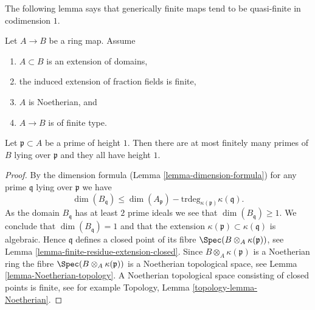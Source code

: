 \noindent
The following lemma says that generically finite maps
tend to be quasi-finite in codimension $1$.

\begin{lemma}
\label{lemma-finite-in-codim-1}
Let $A \to B$ be a ring map.
Assume
\begin{enumerate}
\item $A \subset B$ is an extension of domains,
\item the induced extension of fraction fields is finite,
\item $A$ is Noetherian, and
\item $A \to B$ is of finite type.
\end{enumerate}
Let $\mathfrak p \subset A$ be a prime of height $1$.
Then there are at most finitely many primes of $B$
lying over $\mathfrak p$ and they all have height $1$.
\end{lemma}

\begin{proof}
By the dimension formula (Lemma \ref{lemma-dimension-formula})
for any prime $\mathfrak q$ lying over $\mathfrak p$ we have
$$
\dim(B_{\mathfrak q}) \leq
\dim(A_{\mathfrak p}) - \text{trdeg}_{\kappa(\mathfrak p)} \kappa(\mathfrak q).
$$
As the domain $B_\mathfrak q$ has at least $2$ prime ideals we see that
$\dim(B_{\mathfrak q}) \geq 1$. We conclude that
$\dim(B_{\mathfrak q}) = 1$ and that the extension
$\kappa(\mathfrak p) \subset \kappa(\mathfrak q)$ is algebraic.
Hence $\mathfrak q$ defines a closed point of its fibre
$\Spec(B \otimes_A \kappa(\mathfrak p))$, see
Lemma \ref{lemma-finite-residue-extension-closed}.
Since $B \otimes_A \kappa(\mathfrak p)$ is a Noetherian ring
the fibre $\Spec(B \otimes_A \kappa(\mathfrak p))$
is a Noetherian topological space, see
Lemma \ref{lemma-Noetherian-topology}.
A Noetherian topological space consisting of closed points
is finite, see for example
Topology, Lemma \ref{topology-lemma-Noetherian}.
\end{proof}









